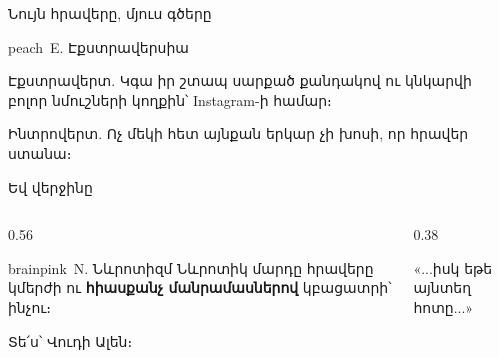 \begin{frame}{Նույն հրավերը, մյուս գծերը}
  \begin{traitbox}{peach}{\ E. Էքստրավերսիա}
    \begin{minipage}[t]{0.48\linewidth}\raggedright
      {\blackfont Էքստրավերտ.} Կգա իր շտապ սարքած քանդակով ու կնկարվի բոլոր նմուշների կողքին՝ Instagram-ի համար։
    \end{minipage}\hfill
    \begin{minipage}[t]{0.48\linewidth}\raggedright
      {\blackfont Ինտրովերտ.} Ոչ մեկի հետ այնքան երկար չի խոսի, որ հրավեր ստանա։
    \end{minipage}
  \end{traitbox}
  \vspace{1mm}
\end{frame}

\begin{frame}{Եվ վերջինը}
  \begin{columns}[c]
    \begin{column}{0.56\textwidth}
      \begin{traitbox}{brainpink}{\ N. Նևրոտիզմ}
        Նևրոտիկ մարդը հրավերը կմերժի ու \textbf{հիասքանչ մանրամասներով} կբացատրի՝ ինչու։\par\smallskip
        Տե՛ս՝ Վուդի Ալեն։
      \end{traitbox}
      \vspace{1mm}
    \end{column}
    \begin{column}{0.38\textwidth}
      \centering
      \par
      {\small\color{plum!70!cream}«...իսկ եթե այնտեղ հոտը...»}
    \end{column}
  \end{columns}
\end{frame}

